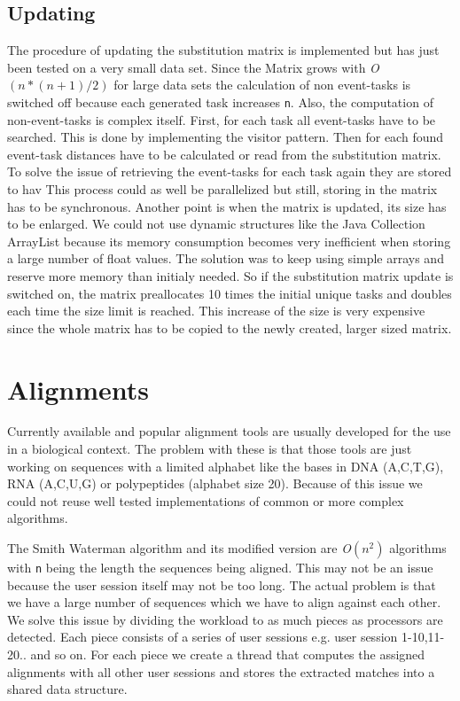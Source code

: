 \subsection{Updating}
	The procedure of updating the substitution matrix is implemented but has just been tested on a very small data set.
	Since the Matrix grows with \textit{O}$(n*(n+1)/2)$ for large data sets the calculation of non event-tasks is switched off because each generated task increases \texttt{n}.
	Also, the computation of non-event-tasks is complex itself.
	First, for each task all event-tasks have to be searched. This is done by implementing the visitor pattern.
	Then for each found event-task distances have to be calculated or read from the substitution matrix.
	To solve the issue of retrieving the event-tasks for each task again they are stored to hav
	This process could as well be parallelized but still, storing in the matrix has to be synchronous.
	Another point is when the matrix is updated, its size has to be enlarged.
	We could not use dynamic structures like the Java Collection ArrayList because its memory consumption becomes very inefficient when storing a large number of
	float values. The solution was to keep using simple arrays and reserve more memory than initialy needed.
	So if the substitution matrix update is switched on, the matrix preallocates 10 times the initial unique tasks and doubles each time the size limit is reached.
	This increase of the size is very expensive since the whole matrix has to be copied to the newly created, larger sized matrix.

\section{Alignments}
Currently available and popular alignment tools are usually developed for the use in a biological context.
The problem with these is that those tools are just working on sequences with a limited alphabet like the bases in DNA (A,C,T,G), RNA (A,C,U,G) or polypeptides (alphabet size 20).
Because of this issue we could not reuse well tested implementations of common or more complex algorithms.

The Smith Waterman algorithm and its modified version are \textit{O}$(n^2)$ algorithms with \texttt{n} being the length the sequences being aligned.
This may not be an issue because the user session itself may not be too long.
The actual problem is that we have a large number of sequences which we have to align against each other.
We solve this issue by dividing the workload to as much pieces as processors are detected. Each piece consists of a series of user sessions e.g. user session 1-10,11-20.. and so on.
For each piece we create a thread that computes the assigned alignments with all other user sessions and stores the extracted matches into a shared data structure.


